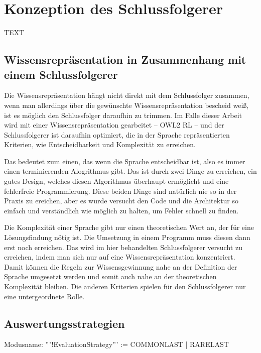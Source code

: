 \chapter{Konzeption des Schlussfolgerer}

TEXT



\section{Wissensrepräsentation in Zusammenhang mit einem Schlussfolgerer}

Die Wissensrepräsentation hängt nicht direkt mit dem Schlussfolger zusammen, wenn man allerdings über die gewünschte Wissensrepräsentation bescheid weiß, ist es möglich den Schlussfolger daraufhin zu trimmen. Im Falle dieser Arbeit wird mit einer Wissensrepräsentation gearbeitet -- OWL2 RL -- und der Schlussfolgerer ist daraufhin optimiert, die in der Sprache repräsentierten Kriterien, wie Entscheidbarkeit und Komplexität zu erreichen.

Das bedeutet zum einen, das wenn die Sprache entscheidbar ist, also es immer einen terminierenden Alogrithmus gibt. Das ist durch zwei Dinge zu erreichen, ein gutes Design, welches diesen Algorithmus überhaupt ermöglicht und eine fehlerfreie Programmierung. Diese beiden Dinge sind natürlich nie so in der Praxis zu ereichen, aber es wurde versucht den Code und die Architektur so einfach und verständlich wie möglich zu halten, um Fehler schnell zu finden.

Die Komplexität einer Sprache gibt nur einen theoretischen Wert an, der für eine Lösungsfindung nötig ist. Die Umsetzung in einem Programm muss diesen dann erst noch erreichen. Das wird im hier behandelten Schlussfolgerer versucht zu erreichen, indem man sich nur auf eine Wissensrepräsentation konzentriert. Damit können die Regeln zur Wissensgewinnung nahe an der Definition der Sprache umgesetzt werden und somit auch nahe an der theoretischen Komplexität bleiben.
Die anderen Kriterien spielen für den Schlussfolgerer nur eine untergeordnete Rolle.





\section{Auswertungsstrategien}
Modusname: '''!EvaluationStrategy''' := COMMONLAST | RARELAST

